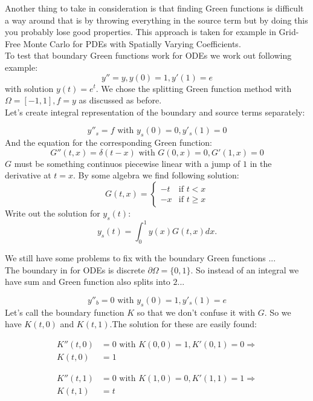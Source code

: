 \documentclass[a4paper,12pt]{article}
\begin{document}
Another thing to take in consideration is that finding Green functions is difficult a way
around that is by throwing everything in the source term but by doing this you probably
lose good properties. This approach is taken for example in Grid-Free Monte Carlo for
PDEs with Spatially Varying Coefficients. \\

To test that boundary Green functions work for ODEs we work out following example:
$$
    y'' = y, y(0) = 1, y'(1)=e
$$
with solution $y(t) = e^{t}$. We chose the splitting Green function method with
$\Omega = [-1,1],f = y$ as discussed as before. \\

Let's create integral representation of the boundary and source terms separately:

$$
    y''_{s} = f \text{ with } y_s(0)=0, y'_s(1)=0
$$
And the equation for the corresponding Green function:
$$
    G''(t,x) = \delta(t-x) \text{ with } G(0,x)=0, G'(1,x)=0
$$
$G$ must be something continuos piecewise linear with a jump of $1$ in the derivative
at $t = x$. By some algebra we find following solution:
$$
    G(t,x) =
    \begin{cases}
        -t & \text{if } t <  x   \\
        -x & \text{if } t \ge  x
    \end{cases}
$$
Write out the solution for $y_{s}(t)$:
$$
    y_{s}(t) = \int_{0}^{1} y(x) G(t,x) dx.
$$

We still have some problems to fix with the boundary Green functions ... \\
The boundary in for ODEs is discrete $\partial \Omega = \{0,1\}$.
So instead of an integral we have sum and Green function also splits into $2$...

$$
    y''_{b} = 0 \text{ with } y_{s}(0)=1, y'_{s}(1)= e
$$
Let's call the boundary function $K$ so that we don't confuse it with $G$.
So we have $K(t,0)$ and $K(t,1)$.The solution for these are easily found:

\begin{align*}
    K''(t,0) & = 0 \text{ with } K(0,0)=1, K'(0,1)=0 \Rightarrow \\
    K(t,0)   & =1
\end{align*}

\begin{align*}
    K''(t,1) & =0 \text{ with } K(1,0)=0, K'(1,1)=1 \Rightarrow \\
    K(t,1)   & =t
\end{align*}
\end{document}
